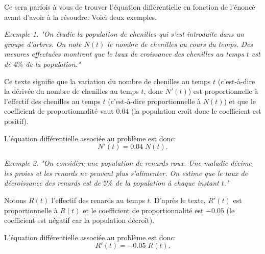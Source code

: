 \documentclass[11pt,class=report,crop=false]{standalone}
\begin{document}
 
Ce sera parfois à vous de trouver l'équation différentielle  en fonction de l'énoncé avant d'avoir à la résoudre. Voici deux exemples.

\medskip

\emph{Exemple 1.}
	\emph{"On étudie la population de chenilles qui s'est introduite dans un groupe d'arbres. On note $N(t)$ le nombre de chenilles au cours du temps. Des mesures effectuées montrent que le taux de croissance des chenilles au temps $t$ est de $4\%$ de la population."}
	
	Ce texte signifie que la variation du nombre de chenilles au temps $t$ (c'est-à-dire la dérivée du nombre de chenilles au temps $t$, donc $N'(t)$) est proportionnelle à l'effectif des chenilles au temps $t$ (c'est-à-dire proportionnelle à $N(t)$) et que le coefficient de proportionnalité vaut $0.04$ (la population croît donc le coefficient est positif).
	
	L'équation différentielle associée au problème est donc:
	\[N'(t)=0.04 \; N(t).\]

\emph{Exemple 2.}
\emph{"On considère une population de renards roux. Une maladie décime les proies et les renards ne peuvent plus s'alimenter. On estime que le taux de décroissance des renards est de $5\%$ de la population à chaque instant $t$."}

Notons $R(t)$ l'effectif des renards au temps $t$. D'après le texte, $R'(t)$ est proportionnelle à $R(t)$ et le coefficient de proportionnalité est $-0.05$ (le coefficient est négatif car la population décroît).

L'équation différentielle associée au problème est donc:
\[R'(t)=-0.05 \; R(t).\]
\end{document}
